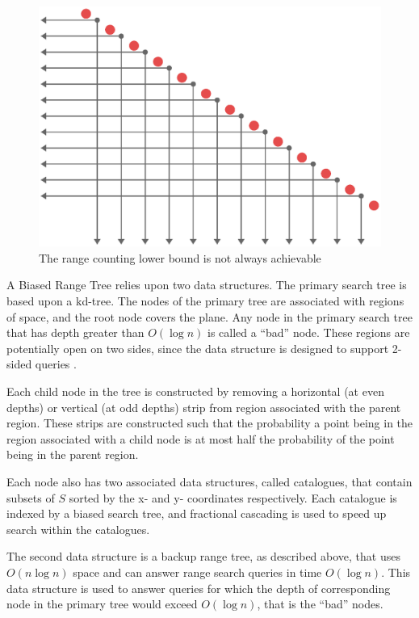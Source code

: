 \documentclass[mcs]{scsthesis}
\begin{document}
\begin{figure}
\begin{center}
\includegraphics[scale=0.6]{diagrams/range_counting.eps}
\caption{The range counting lower bound is not always achievable}
\label{fig:rangelb}
\end{center}
\end{figure}

A Biased Range Tree relies upon two data structures. The primary search tree
is based upon a kd-tree. The nodes of the primary tree are associated with
regions of space, and the root node covers the plane. Any node in the primary
search tree that has depth greater than \(O(\log n)\) is called a ``bad'' node.
These regions are potentially open on two sides, since the data structure is
designed to support 2-sided queries \cite{biasedrange}. 

Each child node in the tree is constructed by removing a horizontal (at even
depths) or vertical (at odd depths) strip from region associated with the
parent region. These strips are constructed such that the probability a point
being in the region associated with a child node is at most half the probability
of the point being in the parent region.

Each node also has two associated data structures, called catalogues, that 
contain subsets of \(S\) sorted by the x- and y- coordinates respectively.
Each catalogue is indexed by a biased search tree, and fractional cascading is
used to speed up search within the catalogues.

The second data structure is a backup range tree, as described above, that 
uses \(O(n \log n)\) space and can answer range search queries in time
\(O(\log n)\). This data structure is used to answer queries for which the
depth of corresponding node in the primary tree would exceed \(O(\log n)\),
that is the ``bad'' nodes.
\end{document}
